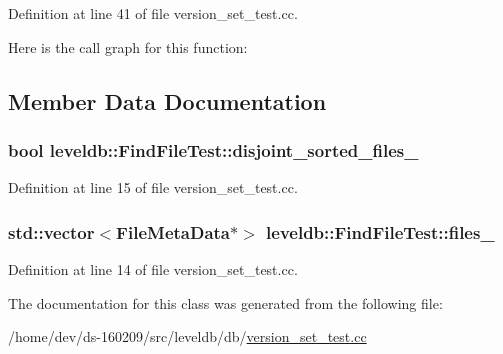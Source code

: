 Definition at line 41 of file version\+\_\+set\+\_\+test.\+cc.



Here is the call graph for this function\+:




\subsection{Member Data Documentation}
\hypertarget{classleveldb_1_1_find_file_test_acf50512be17b9a3cd96388a8c837b8e0}{}
\subsubsection[{disjoint\+\_\+sorted\+\_\+files\+\_\+}]{\setlength{\rightskip}{0pt plus 5cm}bool leveldb\+::\+Find\+File\+Test\+::disjoint\+\_\+sorted\+\_\+files\+\_\+}\label{classleveldb_1_1_find_file_test_acf50512be17b9a3cd96388a8c837b8e0}


Definition at line 15 of file version\+\_\+set\+\_\+test.\+cc.

\hypertarget{classleveldb_1_1_find_file_test_a53b61e6b01283c235fae219013b0e2c7}{}
\subsubsection[{files\+\_\+}]{\setlength{\rightskip}{0pt plus 5cm}std\+::vector$<${\bf File\+Meta\+Data}$\ast$$>$ leveldb\+::\+Find\+File\+Test\+::files\+\_\+}\label{classleveldb_1_1_find_file_test_a53b61e6b01283c235fae219013b0e2c7}


Definition at line 14 of file version\+\_\+set\+\_\+test.\+cc.



The documentation for this class was generated from the following file\+:\begin{DoxyCompactItemize}
\item 
/home/dev/ds-\/160209/src/leveldb/db/\hyperlink{version__set__test_8cc}{version\+\_\+set\+\_\+test.\+cc}\end{DoxyCompactItemize}
